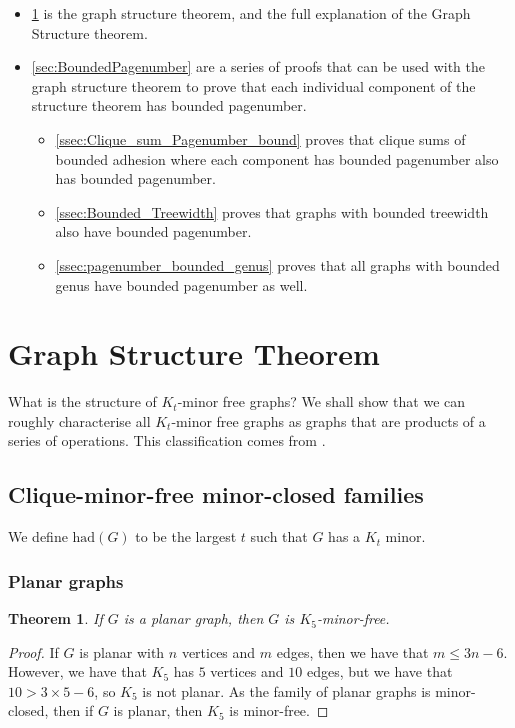 \documentclass[]{report}
\newcommand{\had}{\text{had}}
\newtheorem{theorem}{Theorem}
\theoremstyle{definition}
\numberwithin{theorem}{section}
\numberwithin{equation}{section}
\begin{document}
\begin{itemize}
	\item \cref{sec:Kt_Minor_Free} is the graph structure theorem, and the full explanation of the Graph Structure theorem.
	\item \cref{sec:BoundedPagenumber} are a series of proofs that can be used with the graph structure theorem to prove that each individual component of the structure theorem has bounded pagenumber.
	\begin{itemize}
		\item \cref{ssec:Clique_sum_Pagenumber_bound} proves that clique sums of bounded adhesion where each component has bounded pagenumber also has bounded pagenumber.
		\item \cref{ssec:Bounded_Treewidth} proves that graphs with bounded treewidth also have bounded pagenumber.
		\item \cref{ssec:pagenumber_bounded_genus} proves that all graphs with bounded genus have bounded pagenumber as well.
	\end{itemize}
\end{itemize}

\section{Graph Structure Theorem}\label{sec:Kt_Minor_Free}
What is the structure of $K_t$-minor free graphs? We shall show that we can roughly characterise all $K_t$-minor free graphs as graphs that are products of a series of operations. This classification comes from \cite{robertsonGraphMinorsXVI2003}.
\subsection{Clique-minor-free minor-closed families}\label{ssec:Kt_Minor_Closed_families}
We define $\had(G)$ to be the largest $t$ such that $G$ has a $K_t$ minor. 
\subsubsection{Planar graphs}\label{sssec:K_5-free_Planar}
\begin{theorem}\label{thm:K5_Free_Planar}
	If $G$ is a planar graph, then $G$ is $K_5$-minor-free.
\end{theorem}
\begin{proof}
	If $G$ is planar with $n$ vertices and $m$ edges, then we have that $m \leq 3n -6$. However, we have that $K_5$ has $5$ vertices and $10$ edges, but we have that $ 10 > 3 \times 5 - 6$, so $K_5$ is not planar. As the family of planar graphs is minor-closed, then if $G$ is planar, then $K_5$ is minor-free.
\end{proof}
\end{document}
